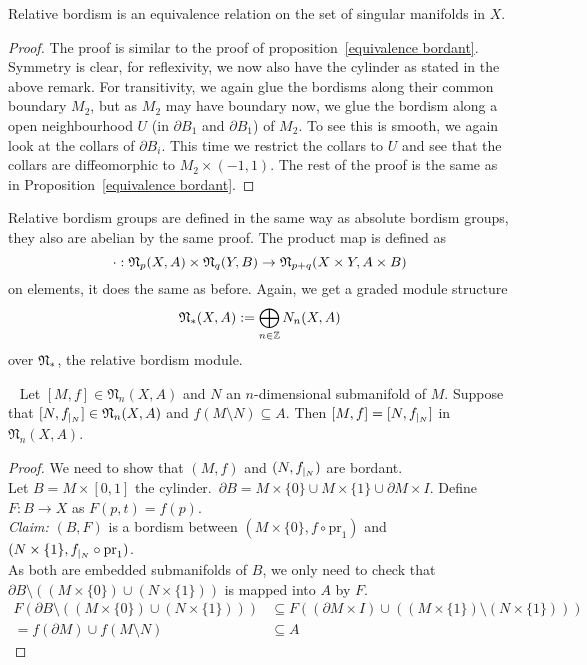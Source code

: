 \documentclass[a4paper,11pt]{article}
\begin{document}
\begin{theorem}\cite[p.525]{dieck}
    Relative bordism is an equivalence relation on the set of singular manifolds in \(X\).
\end{theorem}

\begin{proof}
    The proof is similar to the proof of proposition\ \ref{equivalence bordant}. Symmetry is clear, for reflexivity, we now also have the cylinder as stated in the above remark. For transitivity, we again glue the bordisms along their common boundary \(M_2\), but as \(M_2\) may have boundary now, we glue the bordism along a open neighbourhood \(U\) (in \(\partial B_1\) and \(\partial B_1\)) of \(M_2\). To see this is smooth, we again look at the collars of \(\partial B_i\). This time we restrict the collars to \(U\) and see that the collars are diffeomorphic to \(M_2\times(-1,1)\). The rest of the proof is the same as in Proposition\ \ref{equivalence bordant}.
\end{proof}

Relative bordism groups are defined in the same way as absolute bordism groups, they also are abelian by the same proof. The product map is defined as \[\cdot:\mathfrak{N}_p(X,A)\times\mathfrak{N}_q(Y,B)\to\mathfrak{N}_{p+q}(X\times Y, A\times B)\]
on elements, it does the same as before. Again, we get a graded module structure
\[\mathfrak{N}_\ast(X,A):= \bigoplus_{n\in\mathbb{Z}}N_n(X,A)\]
over \(\mathfrak{N}_\ast\), the relative bordism module.

\begin{lemma}\ \cite[VIII, Lemma 13.10]{tomdieck} \label{almost excision} %
    Let \([M,f]\in\mathfrak{N}_n(X,A)\) and \(N\) an \(n\)-dimensional submanifold of \(M\). 
    Suppose that \([N,f_{|_{N}}]\in\mathfrak{N}_n(X,A)\) and \(f(M\setminus N)\subseteq A\). 
    Then \([M,f]=[N,f_{|_{N}}]\) in \(\mathfrak{N}_n(X,A)\).
\end{lemma}

\begin{proof}\cite{tomdieck}
    We need to show that \((M,f)\) and \((N,f_{|_{N}})\) are bordant.\\
    Let \(B=M\times [0,1]\) the cylinder.\ \(\partial B= M\times\{0\}\cup M\times\{1\}\cup \partial M\times I\). Define \(F:B\to X\) as \(F(p,t)=f(p)\).\\
    \textit{Claim:} \((B,F)\) is a bordism between \((M\times \{0\},f\circ\mathrm{pr}_1)\) and \((N\times \{1\}, f_{|_{N}}\circ\mathrm{pr}_1)\).\\
    As both are embedded submanifolds of \(B\), we only need to check that \(\partial B\setminus((M\times \{0\})\cup (N\times\{1\}))\) is mapped into \(A\) by \(F\).
    \begin{align*}
        F(\partial B\setminus((M\times \{0\})\cup (N\times\{1\})))&\subseteq F((\partial M\times I)\cup ((M\times\{1\})\setminus (N\times \{1\})))\\
        =f(\partial M)\cup f(M\setminus N)&\subseteq A
    \end{align*}
\end{proof}
\end{document}
